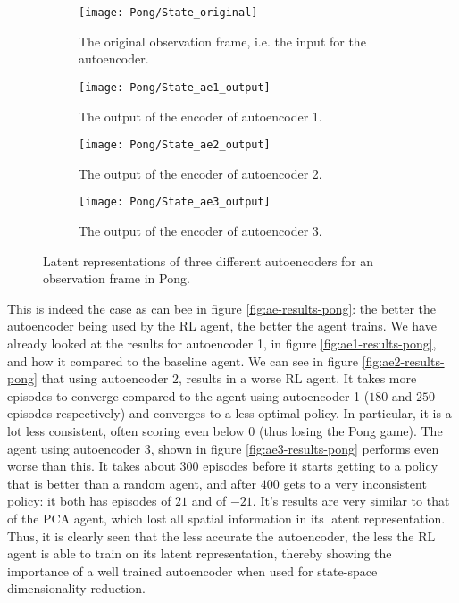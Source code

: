 \begin{figure}[h]
	\centering
	\begin{subfigure}[b]{0.5\textwidth}
		\texttt{[image: Pong/State\_original]}
		\caption{The original observation frame, i.e. the input for the autoencoder.}
		\label{fig:ae-state-original-pong} 
	\end{subfigure}
	\begin{subfigure}[b]{0.75\textwidth}
		\texttt{[image: Pong/State\_ae1\_output]}
		\caption{The output of the encoder of autoencoder 1.}
		\label{fig:ae1-state-pong}
	\end{subfigure}
	\begin{subfigure}[b]{0.5\textwidth}
		\texttt{[image: Pong/State\_ae2\_output]}
		\caption{The output of the encoder of autoencoder 2.}
		\label{fig:ae2-state-pong}
	\end{subfigure}
	\begin{subfigure}[b]{0.5\textwidth}
		\texttt{[image: Pong/State\_ae3\_output]}
		\caption{The output of the encoder of autoencoder 3.}
		\label{fig:ae3-state-pong}
	\end{subfigure}
	\caption{Latent representations of three different autoencoders for an observation frame in Pong.}
	\label{fig:ae-output-pong}
\end{figure}

This is indeed the case as can bee in figure \ref{fig:ae-results-pong}: the better the autoencoder being used by the RL agent, the better the agent trains. We have already looked at the results for autoencoder 1, in figure \ref{fig:ae1-results-pong}, and how it compared to the baseline agent. We can see in figure \ref{fig:ae2-results-pong} that using autoencoder 2, results in a worse RL agent. It takes more episodes to converge compared to the agent using autoencoder 1 ($180$ and $250$ episodes respectively) and converges to a less optimal policy. In particular, it is a lot less consistent, often scoring even below $0$ (thus losing the Pong game). The agent using autoencoder 3, shown in figure \ref{fig:ae3-results-pong} performs even worse than this. It takes about $300$ episodes before it starts getting to a policy that is better than a random agent, and after $400$ gets to a very inconsistent policy: it both has episodes of $21$ and of $-21$. It's results are very similar to that of the PCA agent, which lost all spatial information in its latent representation. Thus, it is clearly seen that the less accurate the autoencoder, the less the RL agent is able to train on its latent representation, thereby showing the importance of a well trained autoencoder when used for state-space dimensionality reduction.


